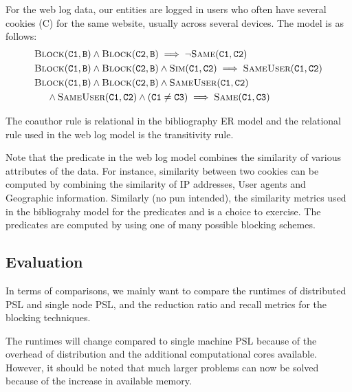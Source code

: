 \documentclass{article}
\begin{document}
For the web log data, our entities are logged in users who often have several cookies (C) for the same website, usually across several devices. The model is as follows:
\begin{eqnarray}
	\begin{aligned}
        & \textsc{Block}(\texttt{C1}, \texttt{B}) \wedge \textsc{Block}(\texttt{C2}, \texttt{B}) \implies \neg \textsc{Same}(\texttt{C1},\texttt{C2})\\ \nonumber
        & \textsc{Block}(\texttt{C1}, \texttt{B}) \wedge \textsc{Block}(\texttt{C2}, \texttt{B}) \wedge \textsc{Sim}(\texttt{C1},\texttt{C2}) \implies \textsc{SameUser}(\texttt{C1},\texttt{C2})\\ \nonumber
        & \textsc{Block}(\texttt{C1}, \texttt{B}) \wedge \textsc{Block}(\texttt{C2}, \texttt{B}) \wedge \textsc{SameUser}(\texttt{C1},\texttt{C2})  \\ \nonumber
        & \ \ \ \ \wedge \textsc{SameUser}(\texttt{C1},\texttt{C2}) \wedge (\texttt{C1} \neq \texttt{C3}) \implies \textsc{Same}(\texttt{C1},\texttt{C3})
	\end{aligned}
\end{eqnarray}

The coauthor rule is relational in the bibliography ER model and the relational rule used in the web log model is the transitivity rule.

Note that the predicate  in the web log model combines the similarity of various attributes of the data. For instance, similarity between two cookies can be computed by combining the similarity of IP addresses, User agents and Geographic information. Similarly (no pun intended), the similarity metrics used in the bibliograhy model for the predicates  and  is a choice to exercise. The  predicates are computed by using one of many possible blocking schemes.

\subsection{Evaluation}

In terms of comparisons, we mainly want to compare the runtimes of distributed PSL and single node PSL, and the reduction ratio and recall metrics for the blocking techniques.

The runtimes will change compared to single machine PSL because of the overhead of distribution and the additional computational cores available. However, it should be noted that much larger problems can now be solved because of the increase in available memory.
\end{document}
